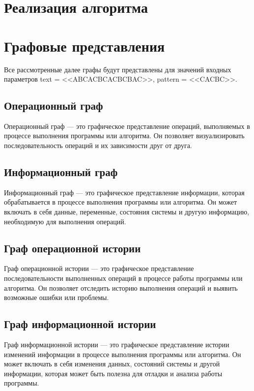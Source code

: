 \documentclass[a4paper,14pt, unknownkeysallowed]{extreport}
\begin{document}
	
	
	
	\chapter{Реализация алгоритма}
	
	
	
	\chapter{Графовые представления}
	
	Все рассмотренные далее графы будут представлены для значений входных параметров text = <<ABCACBCACBCBAC>>, pattern = <<CACBC>>.
	
	\section{Операционный граф}
	
	Операционный граф --- это графическое представление операций, выполняемых в процессе выполнения программы или алгоритма. Он позволяет визуализировать последовательность операций и их зависимости друг от друга.
	
	
	\section{Информационный граф}
	
	Информационный граф --- это графическое представление информации, которая обрабатывается в процессе выполнения программы или алгоритма. Он может включать в себя данные, переменные, состояния системы и другую информацию, необходимую для выполнения операций.
	
	
	\section{Граф операционной истории}
	
	Граф операционной истории --- это графическое представление последовательности выполненных операций в процессе работы программы или алгоритма. Он позволяет отследить историю выполнения операций и выявить возможные ошибки или проблемы.
	
	
	\section{Граф информационной истории}
	
	Граф информационной истории --- это графическое представление истории изменений информации в процессе выполнения программы или алгоритма. Он может включать в себя изменения данных, состояний системы и другой информации, которая может быть полезна для отладки и анализа работы программы.
	
	
\end{document}

